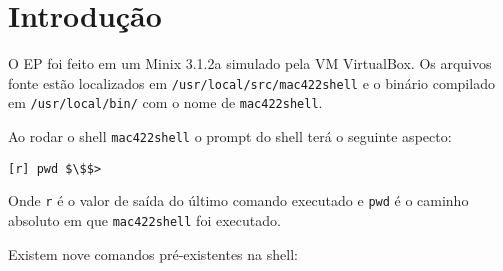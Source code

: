 \documentclass{amsart}
\title[]{\rule{10.5cm}{0.8pt}\\Exercício-Programa 1: mac422shell\\\vspace{2mm}\footnotesize
  Sistemas Operacionais -- MAC0422\\\rule{10cm}{0.8pt}}
\author[]{Renato Lui Geh\\NUSP\@: 8536030}
\theoremstyle{plain}
\newcommand{\code}[1]{\lstinline[mathescape=true]{#1}}
\begin{document}
\date{\today}
\maketitle

\section{Introdução}

O EP foi feito em um Minix 3.1.2a simulado pela VM VirtualBox. Os arquivos fonte estão localizados
em \code{/usr/local/src/mac422shell} e o binário compilado em \code{/usr/local/bin/} com o nome de
\code{mac422shell}.

Ao rodar o shell \code{mac422shell} o prompt do shell terá o seguinte aspecto:

\begin{lstlisting}[mathescape=true,style=nonumbers]
  [r] pwd $\$$>
\end{lstlisting}

Onde \code{r} é o valor de saída do último comando executado e \code{pwd} é o caminho absoluto em
que \code{mac422shell} foi executado.

Existem nove comandos pré-existentes na shell:
\end{document}
